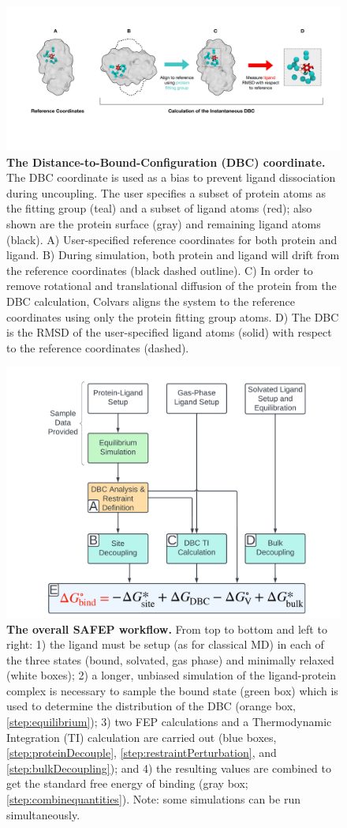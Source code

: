 \documentclass[9pt,tutorial]{Styling/livecoms}
\begin{document}
\onecolumn
\begin{figure}[h]
    \centering
    \includegraphics[width=\textwidth]{DBCfigfinal.pdf}
    \caption{\textbf{The Distance-to-Bound-Configuration (DBC) coordinate.} The DBC coordinate is used as a bias to prevent ligand dissociation during uncoupling. The user specifies a subset of protein atoms as the fitting group (teal) and a subset of ligand atoms (red); also shown are the protein surface (gray) and remaining ligand atoms (black). A) User-specified reference coordinates for both protein and ligand.
    B) During simulation, both protein and ligand will drift from the reference coordinates (black dashed outline).
    C) In order to remove rotational and translational diffusion of the protein from the DBC calculation, Colvars aligns the system to the reference coordinates using only the protein fitting group atoms. 
    D) The DBC is the RMSD of the user-specified ligand atoms (solid) with respect to the reference coordinates (dashed).}
    \label{fig:DBC}
\end{figure}


\begin{figure}[!h]
    \centering
    \includegraphics[width=0.5\linewidth, trim={3cm 0 2cm 0},clip]{CoarseGrainedWorkflow.pdf}
    \caption[test]{\textbf{The overall SAFEP workflow.} From top to bottom and left to right: 1) the ligand must be setup (as for classical MD) in each of the three states (bound, solvated, gas phase) and minimally relaxed (white boxes); 2) a longer, unbiased simulation of the ligand-protein complex is necessary to sample the bound state (green box) which is used to determine the distribution of the DBC (orange box, \ref{step:equilibrium}); 3) two FEP calculations and a Thermodynamic Integration (TI) calculation are carried out (blue boxes, \ref{step:proteinDecouple}, \ref{step:restraintPerturbation}, and \ref{step:bulkDecoupling}); and 4) the resulting values are combined to get the standard free energy of binding (gray box; \ref{step:combinequantities}). Note: some simulations can be run simultaneously.}
    \label{fig:workflow}
\end{figure}
\end{document}
